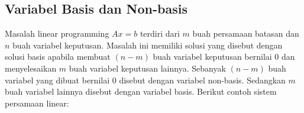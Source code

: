 	
		
		
		
		
		

\subsection{Variabel Basis dan Non-basis}
Masalah linear programming \(Ax = b\) terdiri dari \(m\) buah persamaan batasan dan \(n\) buah variabel keputusan. Masalah ini memiliki solusi yang disebut dengan solusi basis apabila membuat \((n - m)\) buah variabel keputusan bernilai 0 dan menyelesaikan \(m\) buah variabel keputusan lainnya. Sebanyak \((n - m)\) buah variabel yang dibuat bernilai 0 disebut dengan variabel non-basis. Sedangkan \(m\) buah variabel lainnya disebut dengan variabel basis. Berikut contoh sistem persamaan linear:


